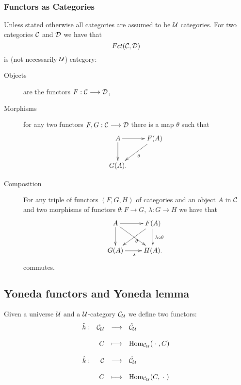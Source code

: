 \subsubsection{Functors as Categories}
Unless stated otherwise all categories are assumed to be $\mathcal{U}$ categories. For two categories $\mathcal{C}$ and $\mathcal{D}$ we have that
$$Fct(\mathcal{C},\mathcal{D})$$
is (not necessarily $\mathcal{U}$) category:
\begin{description}
\item[Objects] are the functors $F: \mathcal{C} \longrightarrow \mathcal{D}$,
\item[Morphisms] for any two functors $F, G: \mathcal{C} \longrightarrow \mathcal{D}$ there is a map $\theta$ such that
$$\xymatrix{
A \ar[d]\ar[r] & F(A)\ar[ld]^\theta\\
G(A).\\
}$$
\item[Composition] For any triple of functors $(F,G,H)$ of categories and an object $A$ in $\mathcal{C}$ and two morphisms of functors $\theta :F \longrightarrow G$, $\lambda: G \longrightarrow H$ we have that
$$\xymatrix{
A \ar[rd]\ar[d]\ar[r] & F(A)\ar[ld]^\theta\ar[d]^{\lambda \circ \theta}\\
G(A) \ar[r]_\lambda & H(A).\\
}$$
commutes.
\end{description}
\subsection{Yoneda functors and Yoneda lemma}
Given a universe $\mathcal{U}$ and a $\mathcal{U}$-category $\mathcal{C}_{\mathcal{U}}$ we define two functors:
$$\begin{array}{rrcl}
\hat{h} : &\mathcal{C}_{\mathcal{U}} &\longrightarrow& \hat{\mathcal{C}}_{\mathcal{U}}\\
&&&\\
&C& \longmapsto& \mathrm{Hom}_{\mathcal{C}_{\mathcal{U}}}(\;\cdot\;,C)\\
&&&\\
\hat{k} :&\mathcal{C} &\longrightarrow& \check{\mathcal{C}}_{\mathcal{U}}\\
&&&\\
&C&\longmapsto&\mathrm{Hom}_{\mathcal{C}_{\mathcal{U}}}(C,\;\cdot\;)\\
\end{array}$$




